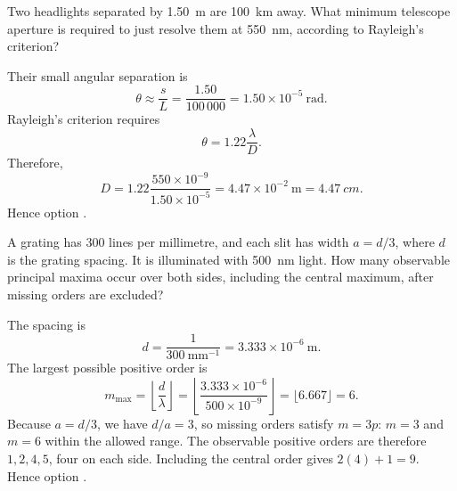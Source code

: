 \begin{quizquestion}[
  id=phy104-opt-059,
  topic=optics,
  difficulty=challenge,
  marks=3,
  correct=A,
  tags={rayleigh-criterion,angular-resolution,aperture},
  outcome={Determine telescope aperture from Rayleigh's criterion}
]
  Two headlights separated by \SI{1.50}{m} are \SI{100}{km} away. What minimum telescope aperture is required to just resolve them at \SI{550}{nm}, according to Rayleigh's criterion?
\end{quizquestion}
\begin{quizsolution}
  Their small angular separation is
    \[
      \theta\approx\frac{s}{L}=\frac{1.50}{100\,000}=1.50\times10^{-5}\ \mathrm{rad}.
    \]
    Rayleigh's criterion requires
    \[
      \theta=1.22\frac{\lambda}{D}.
    \]
    Therefore,
    \[
      D=1.22\frac{550\times10^{-9}}{1.50\times10^{-5}}
      =4.47\times10^{-2}\ \mathrm{m}
      =\SI{4.47}{cm}.
    \]
    Hence option \textbf{\quizcorrectletter}.
\end{quizsolution}

\begin{quizquestion}[
  id=phy104-opt-060,
  topic=optics,
  difficulty=challenge,
  marks=3,
  correct=E,
  tags={diffraction-grating,missing-orders,order-limit},
  outcome={Combine grating-order limits with missing-order conditions}
]
  A grating has \(300\) lines per millimetre, and each slit has width \(a=d/3\), where \(d\) is the grating spacing. It is illuminated with \SI{500}{nm} light. How many observable principal maxima occur over both sides, including the central maximum, after missing orders are excluded?
\end{quizquestion}
\begin{quizsolution}
  The spacing is
    \[
      d=\frac{1}{300\ \mathrm{mm}^{-1}}=3.333\times10^{-6}\ \mathrm{m}.
    \]
    The largest possible positive order is
    \[
      m_{\max}=\left\lfloor\frac{d}{\lambda}\right\rfloor
      =\left\lfloor\frac{3.333\times10^{-6}}{500\times10^{-9}}\right\rfloor
      =\lfloor6.667\rfloor=6.
    \]
    Because \(a=d/3\), we have \(d/a=3\), so missing orders satisfy \(m=3p\): \(m=3\) and \(m=6\) within the allowed range. The observable positive orders are therefore \(1,2,4,5\), four on each side. Including the central order gives \(2(4)+1=9\). Hence option \textbf{\quizcorrectletter}.
\end{quizsolution}
